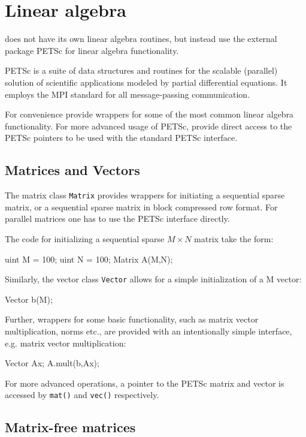 \chapter{Linear algebra}

\dolfin{} does not have its own linear algebra routines, 
but instead use the external package PETSc \cite{www:petsc} 
for linear algebra functionality.    

PETSc is a suite of data structures and routines for the scalable 
(parallel) solution of scientific applications modeled by partial 
differential equations. 
It employs the MPI standard for all message-passing communication.  

For convenience \dolfin{} provide wrappers for some of the most 
common linear algebra functionality. For more advanced usage of 
PETSc, \dolfin{} provide direct access to the PETSc pointers 
to be used with the standard PETSc interface. 

\section{Matrices and Vectors}

The matrix class \texttt{Matrix} provides wrappers for initiating a 
sequential sparse matrix, or a sequential sparse matrix in 
block compressed row format. For parallel matrices one has to use 
the PETSc interface directly. 

The code for initializing a sequential sparse $M\times N$ matrix 
take the form: 
%
\begin{code}
uint M = 100; 
uint N = 100; 
Matrix A(M,N);
\end{code}

Similarly, the vector class \texttt{Vector} allows for a simple 
initialization of a M vector:  
%
\begin{code}
Vector b(M);
\end{code}

Further, wrappers for some basic functionality, such as matrix vector 
multiplication, norms etc., are provided with an intentionally simple interface, 
e.g. matrix vector multiplication: 
%
\begin{code}
Vector Ax;
A.mult(b,Ax);
\end{code} 

For more advanced operations, a pointer to the PETSc matrix and vector is 
accessed by \texttt{mat()} and \texttt{vec()} respectively. 

\section{Matrix-free matrices}

